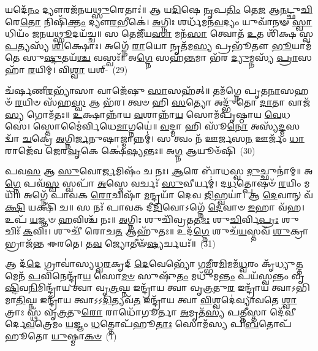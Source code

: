 𑌯𑌦𑍇᳴\-\ul{𑌨𑌂} 𑌦𑍍𑌯𑍗𑌰𑌜᳴𑌨𑌯\-\ul{𑌥𑍍𑌸𑍁}\-𑌰𑍇𑌤𑌾𑌃॑॥ 𑌆 𑌯\-\ul{𑌦𑌿}\-𑌷𑍇 \ul{𑌨𑍃}\-𑌪\-\ul{𑌤𑌿𑌂} 𑌤𑍇\-\ul{𑌜} 𑌆\-\ul{𑌨}\-𑌟𑍍𑌛𑍁\-\ul{𑌚𑌿} 𑌰𑍇\-\ul{𑌤𑍋} 𑌨𑌿𑌷𑌿᳴\-\ul{𑌕𑍍𑌤𑌂} 𑌦𑍍𑌯𑍗\-\ul{𑌰}\-𑌭𑍀𑌕𑍇॑। \ul{𑌅}\-𑌗𑍍𑌨𑌿𑌃 𑌶𑌰𑍍𑌧᳴𑌮𑌨\-\ul{𑌵}\-𑌦𑍍𑌯𑌂 𑌯𑍁𑌵𑌾᳴𑌨𑍟 \ul{𑌸𑍍𑌵𑌾}\-𑌧𑌿𑌯𑌂᳴ 𑌜𑌨𑌯\-\ul{𑌥𑍍𑌸𑍂}\-𑌦𑌯᳴𑌚𑍍𑌚॥ 𑌸 𑌤𑍇𑌜𑍀᳴𑌯\-\ul{𑌸𑌾} 𑌮𑌨᳴\-\ul{𑌸𑌾} 𑌤𑍍𑌵𑍋𑌤᳴ \ul{𑌉}\-𑌤 𑌶𑌿᳴𑌕𑍍𑌷 𑌸𑍍𑌵\-\ul{𑌪}\-𑌤𑍍𑌯𑌸𑍍𑌯᳴ \ul{𑌶𑌿}\-𑌕𑍍𑌷𑍋𑌃। 𑌅𑌗𑍍𑌨𑍇᳴ \ul{𑌰𑌾}\-𑌯𑍋 𑌨𑍃𑌤᳴𑌮\-\ul{𑌸𑍍𑌯} 𑌪𑍍𑌰𑌭𑍂᳴𑌤𑍗 \ul{𑌭𑍂}\-𑌯𑌾𑌮᳴ 𑌤𑍇 𑌸𑍁\-\ul{𑌷𑍍𑌟𑍁}\-𑌤𑌯᳴\-\ul{𑌶𑍍𑌚} 𑌵𑌸𑍍𑌵𑌃᳴॥ 𑌅\-\ul{𑌗𑍍𑌨𑍇} 𑌸𑌹᳴\-\ul{𑌨𑍍𑌤}\-𑌮𑌾 𑌭᳴𑌰 \ul{𑌦𑍍𑌯𑍁}\-𑌮𑍍𑌨𑌸𑍍𑌯᳴ \ul{𑌪𑍍𑌰𑌾}\-𑌸𑌹𑌾᳴ \ul{𑌰}\-𑌯𑌿𑌮𑍍। 𑌵𑌿\-\ul{𑌶𑍍𑌵𑌾} 𑌯𑌶𑍍-~(29)

𑌚᳴𑌰𑍍\mbox{}\-\ul{𑌷}\-𑌣𑍀\-\ul{𑌰}\-𑌭𑍍𑌯𑌾᳴𑌸𑌾 𑌵𑌾𑌜𑍇᳴𑌷𑍁 \ul{𑌸𑌾}\-𑌸𑌹᳴𑌤𑍍॥ 𑌤𑌮᳴𑌗𑍍𑌨𑍇 𑌪𑍃𑌤\-\ul{𑌨𑌾}\-𑌸𑌹𑍞᳴ \ul{𑌰}\-𑌯𑌿𑍞 𑌸᳴𑌹\-\ul{𑌸𑍍𑌵} 𑌆 𑌭᳴𑌰। 𑌤𑍍𑌵𑍞 𑌹𑌿 \ul{𑌸}\-𑌤𑍍𑌯𑍋 𑌅𑌦𑍍𑌭𑍁᳴𑌤𑍋 \ul{𑌦𑌾}\-𑌤𑌾 𑌵𑌾𑌜᳴\-\ul{𑌸𑍍𑌯} 𑌗𑍋𑌮᳴𑌤𑌃॥ \ul{𑌉}\-𑌕𑍍𑌷𑌾𑌨𑍍𑌨𑌾᳴𑌯 \ul{𑌵}\-𑌶𑌾𑌨𑍍𑌨𑌾᳴\-\ul{𑌯} 𑌸𑍋𑌮᳴𑌪𑍃𑌷𑍍𑌠𑌾𑌯 \ul{𑌵𑍇}\-𑌧𑌸𑍇॑। 𑌸𑍍𑌤𑍋𑌮𑍈॑𑌰𑍍𑌵𑌿𑌧𑍇\-\ul{𑌮𑌾}\-𑌗𑍍𑌨𑌯𑍇॑॥ \ul{𑌵}\-𑌦𑍍𑌮𑌾 𑌹𑌿 𑌸𑍂᳴\-\ul{𑌨𑍋} 𑌅𑌸𑍍𑌯᳴\-\ul{𑌦𑍍𑌮}\-𑌸𑌦𑍍𑌵𑌾᳴ \ul{𑌚}\-𑌕𑍍𑌰𑍇 \ul{𑌅}\-𑌗𑍍𑌨𑌿\-\ul{𑌰𑍍𑌜}\-𑌨𑍁𑌷𑌾𑌜𑍍𑌮𑌾𑌨𑍍𑌨𑌮𑍍॑। 𑌸 𑌤𑍍𑌵𑌂 𑌨᳴ 𑌊𑌰𑍍𑌜𑌸\-\ul{𑌨} 𑌊𑌰𑍍𑌜𑌂᳴ \ul{𑌧𑌾} 𑌰𑌾𑌜𑍇᳴𑌵 𑌜𑍇𑌰\-\ul{𑌵𑍃}\-𑌕𑍇 𑌕𑍍𑌷𑍇॑\-\ul{𑌷𑍍𑌯}\-𑌨𑍍𑌤𑌃॥ 𑌅\-\ul{𑌗𑍍𑌨} 𑌆𑌯𑍂𑍞᳴𑌷𑌿~(30)

𑌪𑌵\-\ul{𑌸} 𑌆 \ul{𑌸𑍁}\-𑌵𑍋\-\ul{𑌰𑍍𑌜}\-𑌮𑌿𑌷𑌂᳴ 𑌚 𑌨𑌃। \ul{𑌆}\-𑌰𑍇 𑌬𑌾᳴𑌧𑌸𑍍𑌵 \ul{𑌦𑍁}\-𑌚𑍍𑌛𑍁𑌨𑌾॑𑌮𑍍॥ 𑌅\-\ul{𑌗𑍍𑌨𑍇} 𑌪𑌵᳴\-\ul{𑌸𑍍𑌵} 𑌸𑍍𑌵𑌪𑌾᳴ \ul{𑌅}\-𑌸𑍍𑌮𑍇 𑌵𑌰𑍍𑌚𑌃᳴ \ul{𑌸𑍁}\-𑌵𑍀𑌰𑍍𑌯𑌮𑍍॑। 𑌦\-\ul{𑌧}\-𑌤𑍍𑌪𑍋𑌷𑍞᳴ \ul{𑌰}\-𑌯𑌿𑌂 𑌮𑌯𑌿᳴॥ 𑌅𑌗𑍍𑌨𑍇᳴ 𑌪𑌾𑌵𑌕 \ul{𑌰𑍋}\-𑌚𑌿𑌷𑌾᳴ \ul{𑌮}\-𑌨𑍍𑌦𑍍𑌰𑌯𑌾᳴ 𑌦𑍇𑌵 \ul{𑌜𑌿}\-𑌹𑍍𑌵𑌯𑌾॑। 𑌆 \ul{𑌦𑍇}\-𑌵𑌾𑌨𑍍 𑌵᳴\-\ul{𑌕𑍍𑌷𑌿} 𑌯𑌕𑍍𑌷𑌿᳴ 𑌚॥ 𑌸 𑌨𑌃᳴ 𑌪𑌾𑌵𑌕 𑌦𑍀\-\ul{𑌦𑌿}\-𑌵𑍋\-𑌽𑌗𑍍𑌨𑍇᳴ \ul{𑌦𑍇}\-𑌵𑌾𑍞 \ul{𑌇}\-𑌹𑌾 𑌵᳴𑌹। 𑌉𑌪᳴ \ul{𑌯}\-𑌜𑍍𑌞𑍞 \ul{𑌹}\-𑌵𑌿𑌶𑍍𑌚᳴ 𑌨𑌃॥ \ul{𑌅}\-𑌗𑍍𑌨𑌿𑌃 𑌶𑍁𑌚𑌿᳴𑌵𑍍𑌰𑌤𑌤\-\ul{𑌮𑌃} 𑌶𑍁\-\ul{𑌚𑌿}\-𑌰𑍍𑌵𑌿\-\ul{𑌪𑍍𑌰𑌃} 𑌶𑍁𑌚𑌿𑌃᳴ \ul{𑌕}\-𑌵𑌿𑌃। 𑌶𑍁𑌚𑍀᳴ 𑌰𑍋𑌚\-\ul{𑌤} 𑌆𑌹𑍁᳴𑌤𑌃॥ 𑌉𑌦᳴\-\ul{𑌗𑍍𑌨𑍇} 𑌶𑍁𑌚᳴\-\ul{𑌯}\-𑌸𑍍𑌤𑌵᳴ \ul{𑌶𑍁}\-𑌕𑍍𑌰𑌾 𑌭𑍍𑌰𑌾𑌜᳴𑌨𑍍𑌤 𑌈𑌰𑌤𑍇। 𑌤\-\ul{𑌵} 𑌜𑍍𑌯𑍋𑌤𑍀𑍟᳴\-\ul{𑌷𑍍𑌯}\-𑌰𑍍𑌚𑌯𑌃᳴॥~(31)

{\anuvakamend[{\-\ul{𑌪𑍁}\-\-\ul{𑌰𑍁}\-\-\ul{𑌨𑌿}\-𑌷𑍍𑌠𑌃 𑌪𑍁᳴𑌰𑍍𑌵𑌣𑍀𑌕 𑌭\-\ul{𑌰𑌾}\-\-𑌽𑌭𑌿 𑌵𑌯𑍋᳴\-\ul{𑌭𑌿}\-𑌰𑍍𑌯 𑌆𑌯𑍂𑍞᳴\-\ul{𑌷𑌿} 𑌵𑌿\-\ul{𑌪𑍍𑌰𑌃} 𑌶𑍁\-\ul{𑌚𑌿}\-𑌶𑍍𑌚𑌤𑍁᳴𑌰𑍍𑌦𑌶 𑌚}]}%

{}


\setcounter{anuvakam}{0}
𑌆 𑌦᳴\-\ul{𑌦𑍇} 𑌗𑍍𑌰𑌾𑌵𑌾॑𑌸𑍍𑌯𑌧𑍍𑌵\-\ul{𑌰}\-𑌕𑍃𑌦𑍍 \ul{𑌦𑍇}\-𑌵𑍇𑌭𑍍𑌯𑍋᳴ 𑌗\-\ul{𑌮𑍍𑌭𑍀}\-𑌰\-\ul{𑌮𑌿}\-𑌮𑌮᳴\-\ul{𑌧𑍍𑌵}\-𑌰𑌂 𑌕𑍃᳴𑌧𑍍𑌯𑍁\-\ul{𑌤𑍍𑌤}\-𑌮𑍇𑌨᳴ \ul{𑌪}\-𑌵𑌿𑌨𑍇𑌨𑍍𑌦𑍍𑌰𑌾᳴\-\ul{𑌯} 𑌸𑍋\-\ul{𑌮}\-\-\ul{𑍞} 𑌸𑍁𑌷𑍁᳴\-\ul{𑌤𑌂} 𑌮𑌧𑍁᳴𑌮\-\ul{𑌨𑍍𑌤𑌂} 𑌪𑌯᳴𑌸𑍍𑌵𑌨𑍍𑌤𑌂 𑌵𑍃\-\ul{𑌷𑍍𑌟𑌿}\-𑌵\-\ul{𑌨𑌿}\-𑌮𑌿𑌨𑍍𑌦𑍍𑌰𑌾᳴𑌯 𑌤𑍍𑌵𑌾 𑌵𑍃\-\ul{𑌤𑍍𑌰}\-𑌘𑍍𑌨 𑌇𑌨𑍍𑌦𑍍𑌰𑌾᳴𑌯 𑌤𑍍𑌵𑌾 𑌵𑍃\-\ul{𑌤𑍍𑌰}\-𑌤𑍁\-\ul{𑌰} 𑌇𑌨𑍍𑌦𑍍𑌰𑌾᳴𑌯 𑌤𑍍𑌵𑌾\-𑌽𑌭𑌿𑌮𑌾\-\ul{𑌤𑌿}\-𑌘𑍍𑌨 𑌇𑌨𑍍𑌦𑍍𑌰𑌾᳴𑌯 𑌤𑍍𑌵𑌾\-𑌽\-𑌽\-\ul{𑌦𑌿}\-𑌤𑍍𑌯𑌵᳴\-\ul{𑌤} 𑌇𑌨𑍍𑌦𑍍𑌰𑌾᳴𑌯 𑌤𑍍𑌵𑌾 \ul{𑌵𑌿}\-𑌶𑍍𑌵𑌦𑍇॑𑌵𑍍𑌯𑌾𑌵𑌤𑍇 \ul{𑌶𑍍𑌵𑌾}\-𑌤𑍍𑌰𑌾𑌃 𑌸𑍍𑌥᳴ 𑌵𑍃\-\ul{𑌤𑍍𑌰}\-𑌤𑍁\-\ul{𑌰𑍋} 𑌰𑌾𑌧𑍋᳴𑌗𑍂𑌰𑍍𑌤𑌾 \ul{𑌅}\-𑌮𑍃𑌤᳴\-\ul{𑌸𑍍𑌯} 𑌪\-\ul{𑌤𑍍𑌨𑍀}\-𑌸𑍍𑌤𑌾 𑌦𑍇᳴𑌵𑍀𑌰𑍍𑌦𑍇\-\ul{𑌵}\-𑌤𑍍𑌰𑍇𑌮𑌂 \ul{𑌯}\-𑌜𑍍𑌞𑌂 \ul{𑌧}\-𑌤𑍍𑌤𑍋𑌪᳴𑌹𑍂\-\ul{𑌤𑌾𑌃} 𑌸𑍋𑌮᳴𑌸𑍍𑌯 𑌪𑌿\-\ul{𑌬}\-𑌤𑍋𑌪᳴𑌹𑍂𑌤𑍋 \ul{𑌯𑍁}\-𑌷𑍍𑌮𑌾\-\ul{𑌕}\-\-\ul{𑍞}\-~(1)

